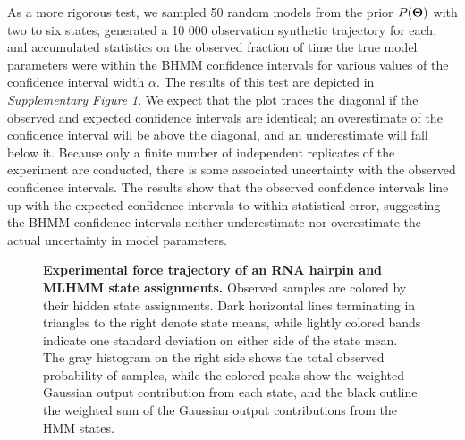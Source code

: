 \documentclass[aps,pre,twocolumn,superscriptaddress,nofootinbib,longbibliography]{revtex4-1}
\newcommand{\bfm}[1]{{\bf #1}}
\begin{document}
{As a more rigorous test, we sampled 50 random models from the prior $P(\bfm{\Theta})$ with two to six states, generated a 10 000 observation synthetic trajectory for each, and accumulated statistics on the observed fraction of time the true model parameters were within the BHMM confidence intervals for various values of the confidence interval width $\alpha$.
The results of this test are depicted in \emph{Supplementary Figure 1}. %
We expect that the plot traces the diagonal if the observed and expected confidence intervals are identical; an overestimate of the confidence interval will be above the diagonal, and an underestimate will fall below it.
Because only a finite number of independent replicates of the experiment are conducted, there is some associated uncertainty with the observed confidence intervals.
The results show that the observed confidence intervals line up with the expected confidence intervals to within statistical error, suggesting the BHMM confidence intervals neither underestimate nor overestimate the actual uncertainty in model parameters.



\begin{figure}[tbp]
\noindent
{}
\caption{{\bf Experimental force trajectory of %
{\color{red} an RNA} hairpin and MLHMM state assignments.}
Observed samples are colored by their hidden state assignments.
Dark horizontal lines terminating in triangles to the right denote state means, while lightly colored bands indicate one standard deviation on either side of the state mean.
The gray histogram on the right side shows the total observed probability of samples, while the colored peaks show the weighted Gaussian output contribution from each state, and the black outline the weighted sum of the Gaussian output contributions from the HMM states.
\label{figure:p5ab-observed-trajectory}}
\end{figure}

}
\end{document}
